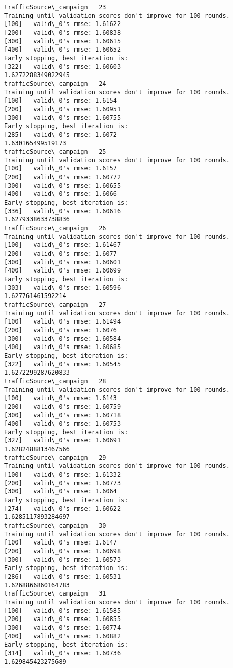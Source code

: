 \documentclass[11pt]{article}
\begin{document}
\begin{Verbatim}[commandchars=\\\{\}]
trafficSource\_campaign   23
Training until validation scores don't improve for 100 rounds.
[100]	valid\_0's rmse: 1.61622
[200]	valid\_0's rmse: 1.60838
[300]	valid\_0's rmse: 1.60615
[400]	valid\_0's rmse: 1.60652
Early stopping, best iteration is:
[322]	valid\_0's rmse: 1.60603
1.6272288349022945
trafficSource\_campaign   24
Training until validation scores don't improve for 100 rounds.
[100]	valid\_0's rmse: 1.6154
[200]	valid\_0's rmse: 1.60951
[300]	valid\_0's rmse: 1.60755
Early stopping, best iteration is:
[285]	valid\_0's rmse: 1.6072
1.630165499519173
trafficSource\_campaign   25
Training until validation scores don't improve for 100 rounds.
[100]	valid\_0's rmse: 1.6157
[200]	valid\_0's rmse: 1.60772
[300]	valid\_0's rmse: 1.60655
[400]	valid\_0's rmse: 1.6066
Early stopping, best iteration is:
[336]	valid\_0's rmse: 1.60616
1.6279338633738836
trafficSource\_campaign   26
Training until validation scores don't improve for 100 rounds.
[100]	valid\_0's rmse: 1.61467
[200]	valid\_0's rmse: 1.6077
[300]	valid\_0's rmse: 1.60601
[400]	valid\_0's rmse: 1.60699
Early stopping, best iteration is:
[303]	valid\_0's rmse: 1.60596
1.627761461592214
trafficSource\_campaign   27
Training until validation scores don't improve for 100 rounds.
[100]	valid\_0's rmse: 1.61494
[200]	valid\_0's rmse: 1.6076
[300]	valid\_0's rmse: 1.60584
[400]	valid\_0's rmse: 1.60685
Early stopping, best iteration is:
[322]	valid\_0's rmse: 1.60545
1.6272299287620833
trafficSource\_campaign   28
Training until validation scores don't improve for 100 rounds.
[100]	valid\_0's rmse: 1.6143
[200]	valid\_0's rmse: 1.60759
[300]	valid\_0's rmse: 1.60718
[400]	valid\_0's rmse: 1.60753
Early stopping, best iteration is:
[327]	valid\_0's rmse: 1.60691
1.6282488813467566
trafficSource\_campaign   29
Training until validation scores don't improve for 100 rounds.
[100]	valid\_0's rmse: 1.61332
[200]	valid\_0's rmse: 1.60773
[300]	valid\_0's rmse: 1.6064
Early stopping, best iteration is:
[274]	valid\_0's rmse: 1.60622
1.6285117893284697
trafficSource\_campaign   30
Training until validation scores don't improve for 100 rounds.
[100]	valid\_0's rmse: 1.6147
[200]	valid\_0's rmse: 1.60698
[300]	valid\_0's rmse: 1.60573
Early stopping, best iteration is:
[286]	valid\_0's rmse: 1.60531
1.6268866860164783
trafficSource\_campaign   31
Training until validation scores don't improve for 100 rounds.
[100]	valid\_0's rmse: 1.61585
[200]	valid\_0's rmse: 1.60855
[300]	valid\_0's rmse: 1.60774
[400]	valid\_0's rmse: 1.60882
Early stopping, best iteration is:
[314]	valid\_0's rmse: 1.60736
1.629845423275689

\end{Verbatim}
\end{document}
